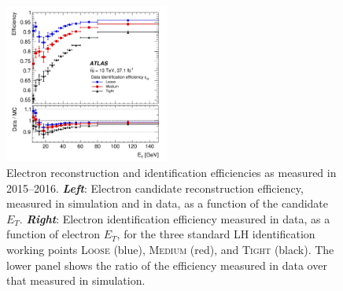 \begin{figure}[!htb]
    \begin{center}
        \includegraphics[width=0.48\textwidth]{figures/chapter3/egamma/egamma_id_eff_Et}
        \caption{
            Electron reconstruction and identification efficiencies as measured in 2015--2016.
            \textbf{\textit{Left}}: Electron candidate reconstruction efficiency, measured in simulation and in data, as
                a function of the candidate $E_T$.
            \textbf{\textit{Right}}: Electron identification efficiency measured in data, as a function of electron $E_T$,
                for the three standard LH identification working points \textsc{Loose} (blue), \textsc{Medium} (red), and \textsc{Tight} (black).
                The lower panel shows the ratio of the efficiency measured in data over that measured in simulation.
        }
        \label{fig:egamma_eff_Et}
    \end{center}
\end{figure}

%
%
